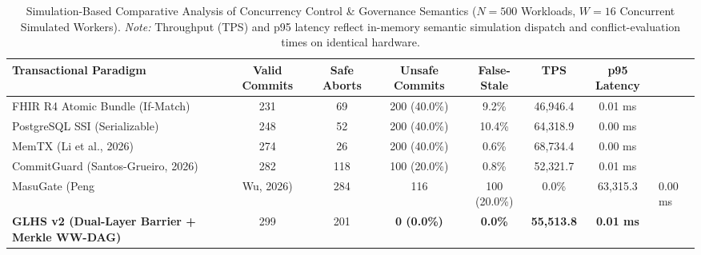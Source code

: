 \begin{table}[t]
\centering
\small
\caption{Simulation-Based Comparative Analysis of Concurrency Control \& Governance Semantics ($N=500$ Workloads, $W=16$ Concurrent Simulated Workers). \textit{Note:} Throughput (TPS) and p95 latency reflect in-memory semantic simulation dispatch and conflict-evaluation times on identical hardware.}
\label{tab:peer_transactional_baselines}
\begin{tabularx}{\textwidth}{p{4.2cm} c c c c c c}
\toprule
\textbf{Transactional Paradigm} & \textbf{Valid Commits} & \textbf{Safe Aborts} & \textbf{Unsafe Commits} & \textbf{False-Stale} & \textbf{TPS} & \textbf{p95 Latency} \\
\midrule
FHIR R4 Atomic Bundle (If-Match) & 231 & 69 & 200 (40.0\%) & 9.2\% & 46,946.4 & 0.01 ms \\
PostgreSQL SSI (Serializable) & 248 & 52 & 200 (40.0\%) & 10.4\% & 64,318.9 & 0.00 ms \\
MemTX (Li et al., 2026) & 274 & 26 & 200 (40.0\%) & 0.6\% & 68,734.4 & 0.00 ms \\
CommitGuard (Santos-Grueiro, 2026) & 282 & 118 & 100 (20.0\%) & 0.8\% & 52,321.7 & 0.01 ms \\
MasuGate (Peng & Wu, 2026) & 284 & 116 & 100 (20.0\%) & 0.0\% & 63,315.3 & 0.00 ms \\
\textbf{GLHS v2 (Dual-Layer Barrier + Merkle WW-DAG)} & 299 & 201 & \textbf{0 (0.0\%)} & \textbf{0.0\%} & \textbf{55,513.8} & \textbf{0.01 ms} \\
\bottomrule
\end{tabularx}
\end{table}
